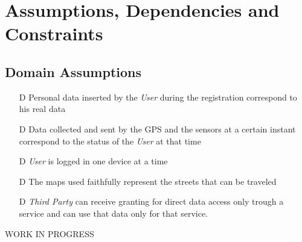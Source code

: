 \documentclass[../../rasd.tex]{subfiles}
\begin{document}
\section{Assumptions, Dependencies and Constraints}
		\subsection{Domain Assumptions}
			 	\begin{itemize}
				 	\item[D\subs{1}]Personal data inserted by the \textit{User} during the registration correspond to his real data
					\item[D\subs{2}]Data collected and sent by the GPS and the sensors at a certain instant correspond to the status of the \textit{User} at that time
				
					\item[D\subs{3}]\textit{User} is logged in one device at a time

					\item[D\subs{4}]The maps used faithfully represent the streets that can be traveled
					\item[D\subs{5}]\textit{Third Party} can receive granting for direct data access only trough a service and can use that data only for that service.
				
				\end{itemize}
		WORK IN PROGRESS
		
\end{document}
